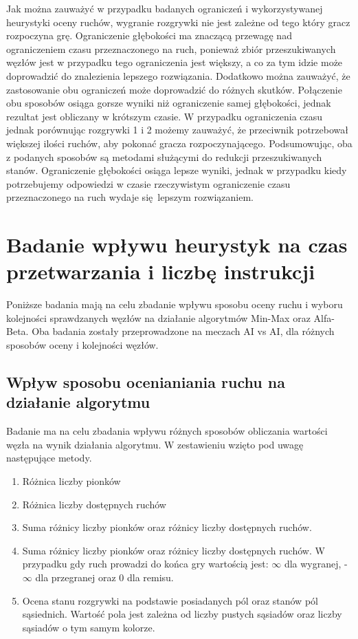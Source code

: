 \documentclass[a4paper,10pt]{article}
\begin{document}
     Jak można zauważyć w przypadku badanych ograniczeń i wykorzystywanej heurystyki oceny ruchów, wygranie rozgrywki nie jest zależne od tego który gracz rozpoczyna grę. Ograniczenie głębokości ma znaczącą przewagę nad ograniczeniem czasu przeznaczonego na ruch, ponieważ zbiór przeszukiwanych węzłów jest w przypadku tego ograniczenia jest większy, a co za tym idzie może doprowadzić do znalezienia lepszego rozwiązania. Dodatkowo można zauważyć, że zastosowanie obu ograniczeń może doprowadzić do różnych skutków. Połączenie obu sposobów osiąga gorsze wyniki niż ograniczenie samej głębokości, jednak rezultat jest obliczany w krótszym czasie. W przypadku ograniczenia czasu jednak porównując rozgrywki 1 i 2 możemy zauważyć, że przeciwnik potrzebował większej ilości ruchów, aby pokonać gracza rozpoczynającego. Podsumowując, oba z podanych sposobów są metodami służącymi do redukcji przeszukiwanych stanów. Ograniczenie głębokości osiąga lepsze wyniki, jednak w przypadku kiedy potrzebujemy odpowiedzi w czasie rzeczywistym ograniczenie czasu przeznaczonego na ruch wydaje się lepszym rozwiązaniem.
    
    \section{Badanie wpływu heurystyk na czas przetwarzania i liczbę instrukcji}
    Poniższe badania mają na celu zbadanie wpływu sposobu oceny ruchu i wyboru kolejności sprawdzanych węzłów na działanie algorytmów Min-Max oraz Alfa-Beta. Oba badania zostały przeprowadzone na meczach AI vs AI, dla różnych sposobów oceny i kolejności węzłów. 
    
    \subsection{Wpływ sposobu ocenianiania ruchu na działanie algorytmu}
    Badanie ma na celu zbadania wpływu różnych sposobów obliczania wartości węzła na wynik działania algorytmu. W zestawieniu wzięto pod uwagę następujące metody.
    
    \begin{enumerate}
    \item Różnica liczby pionków
    \item Różnica liczby dostępnych ruchów
     \item Suma różnicy liczby pionków oraz różnicy liczby dostępnych ruchów.
     \item Suma różnicy liczby pionków oraz różnicy liczby dostępnych ruchów. W przypadku gdy ruch prowadzi do końca gry wartością jest: $\infty$ dla wygranej, -$\infty$ dla przegranej oraz 0 dla remisu.
     \item Ocena stanu rozgrywki na podstawie posiadanych pól oraz stanów pól sąsiednich. Wartość pola jest zależna od liczby pustych sąsiadów oraz liczby sąsiadów o tym samym kolorze.
    \end{enumerate}
    
\end{document}
